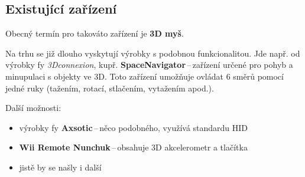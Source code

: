 \subsection{Existující zařízení}\label{solutions}

Obecný termín pro takováto zařízení je {\bf 3D myš}.

Na trhu se již dlouho vyskytují výrobky s podobnou funkcionalitou.
Jde např. od výrobky fy {\it 3Dconnexion}, kupř. {\bf SpaceNavigator}\,--\,zařízení
určené pro pohyb a minupulaci s objekty ve 3D. Toto zařízení umožňuje
ovládat 6 směrů pomocí jedné ruky (tažením, rotací, stlačením, vytažením
apod.).

Další možnosti:
\begin{itemize}
\item{výrobky fy {\bf Axsotic}\,--\,něco podobného, využívá standardu HID}
\item{{\bf Wii Remote Nunchuk}\,--\,obsahuje 3D akcelerometr a tlačítka}
\item{jistě by se našly i další}
\end{itemize}
